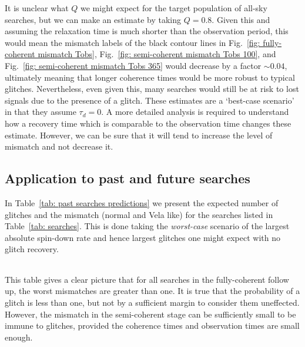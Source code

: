 \documentclass[../full_thesis/full_thesis.tex]{subfiles}
\newcommand{\thisdir}{../glitches_in_CGW}
\begin{document}
It is unclear what $Q$ we might expect for the target population of all-sky
searches, but we can make an estimate by taking $Q=0.8$. Given this and
assuming the relaxation time is much shorter than the observation period, this
would mean the mismatch labels of the black contour lines in Fig.~\ref{fig:
fully-coherent mismatch Tobs}, Fig.~\ref{fig: semi-coherent mismatch Tobs 100},
and Fig.~\ref{fig: semi-coherent mismatch Tobs 365} would decrease by a factor
$\sim0.04$, ultimately meaning that longer coherence times would be more robust
to typical glitches. Nevertheless, even given this, many searches would still
be at risk to lost signals due to the presence of a glitch. These estimates are
a `best-case scenario' in that they assume $\tau_d =0$. A more detailed
analysis is required to understand how a recovery time which is comparable to
the observation time changes these estimate. However, we can be sure that it
will tend to increase the level of mismatch and not decrease it.

\subsection{Application to past and future searches}
In Table~\ref{tab: past searches predictions} we present the expected number
of glitches and the mismatch (normal and Vela like) for the searches listed in
Table~\ref{tab: searches}. This is done taking the \emph{worst-case} scenario
of the largest absolute spin-down rate and hence largest glitches one might
expect with no glitch recovery.
\begin{table*}
\centering
\caption{Predictions for the expected number of glitches and mismatch at the
         largest spin-down rates for the searches listed in
         table~\ref{tab: searches}. We present results both for the initial
         semi-coherent search mismatch and then for the mismatch in a fully-coherent
         search over the full observation time; note that the supernova
         remnants search was a fully-coherent search only and we give only the
         estimate for Cas A}
\label{tab: past searches predictions}
\tabcolsep=0.06cm
\small
\begin{tabular}{l|l|l|l|l|l|l|}

\end{tabular}
\end{table*}
This table gives a clear picture that for all searches in the fully-coherent
follow up, the worst mismatches are greater than one. It is true that the probability
of a glitch is less than one, but not by a sufficient margin to consider them
uneffected. However, the mismatch in the semi-coherent stage can be sufficiently
small to be immune to glitches, provided the coherence times and observation
times are small enough.
\end{document}
